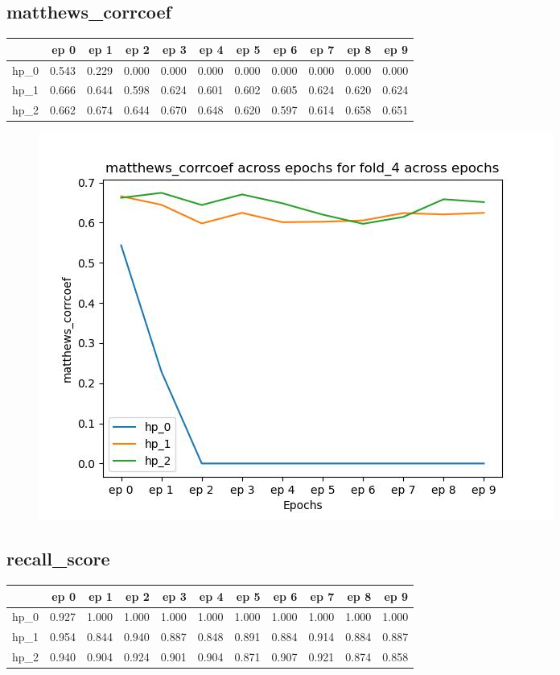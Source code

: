 \documentclass{article}
\begin{document}
\subsection{matthews\_corrcoef}
\begin{tabular}{lrrrrrrrrrr}
\toprule
{} &   ep 0 &   ep 1 &   ep 2 &   ep 3 &   ep 4 &   ep 5 &   ep 6 &   ep 7 &   ep 8 &   ep 9 \\
\midrule
hp\_0 &  0.543 &  0.229 &  0.000 &  0.000 &  0.000 &  0.000 &  0.000 &  0.000 &  0.000 &  0.000 \\
hp\_1 &  0.666 &  0.644 &  0.598 &  0.624 &  0.601 &  0.602 &  0.605 &  0.624 &  0.620 &  0.624 \\
hp\_2 &  0.662 &  0.674 &  0.644 &  0.670 &  0.648 &  0.620 &  0.597 &  0.614 &  0.658 &  0.651 \\
\bottomrule
\end{tabular}

\begin{figure}[H]
\includegraphics[scale = 0.75]{fold_4/matthews_corrcoef}
\end{figure}
\subsection{recall\_score}
\begin{tabular}{lrrrrrrrrrr}
\toprule
{} &   ep 0 &   ep 1 &   ep 2 &   ep 3 &   ep 4 &   ep 5 &   ep 6 &   ep 7 &   ep 8 &   ep 9 \\
\midrule
hp\_0 &  0.927 &  1.000 &  1.000 &  1.000 &  1.000 &  1.000 &  1.000 &  1.000 &  1.000 &  1.000 \\
hp\_1 &  0.954 &  0.844 &  0.940 &  0.887 &  0.848 &  0.891 &  0.884 &  0.914 &  0.884 &  0.887 \\
hp\_2 &  0.940 &  0.904 &  0.924 &  0.901 &  0.904 &  0.871 &  0.907 &  0.921 &  0.874 &  0.858 \\
\bottomrule
\end{tabular}
\end{document}
